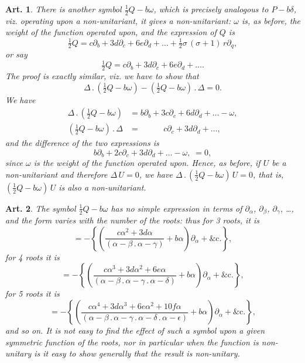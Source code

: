 \documentclass[11pt,a4paper]{article}
\theoremstyle{cayley}
\newtheorem{art}{Art.}[section]
\begin{document}
\setcounter{art}{27}
\begin{art}
There is another symbol $\frac{1}{2}Q - b\omega$, which is precisely analogous to $P - b\delta$, viz. operating upon a non-unitariant, it gives a non-unitariant: $\omega$ is, as before, the weight of the function operated upon, and the expression of $Q$ is
\[
\tfrac{1}{2}Q = c\partial_{b} + 3d\partial_{c} + 6e\partial_{d} + \ldots + \tfrac{1}{2}\sigma\,(\sigma + 1)\,r\partial_{q},
\]
or say
\[
\tfrac{1}{2}Q = c\partial_{b} + 3d\partial_{c} + 6e\partial_{d} + \ldots.
\]
The proof is exactly similar, viz. we have to show that
\[
\Delta\,.\,(\tfrac{1}{2}Q - b\omega) - (\tfrac{1}{2}Q - b\omega)\,.\,\Delta = 0.
\]
We have
\begin{align*}
\Delta\,.\,(\tfrac{1}{2}Q - b\omega) &= b\partial_{b} + 3c\partial_{c} + 6d\partial_{d} + \ldots - \omega,\\
(\tfrac{1}{2}Q - b\omega)\,.\,\Delta &= \phantom{b\partial_{b} +}\; c\partial_{c} + 3d\partial_{d} + \ldots,
\end{align*}
and the difference of the two expressions is
\[
b\partial_{b} + 2c\partial_{c} + 3d\partial_{d} + \ldots - \omega,\; = 0,
\]
since $\omega$ is the weight of the function operated upon. Hence, as before, if $U$ be a non-unitariant and therefore $\Delta\,U = 0$, we have $\Delta\,.\,(\frac{1}{2}Q - b\omega)\,U = 0$, that is, $(\frac{1}{2}Q - b\omega)\,U$ is also a non-unitariant.
\end{art}

\setcounter{art}{28}
\begin{art}
The symbol $\frac{1}{2}Q - b\omega$ has no simple expression in terms of $\partial_{\alpha}$, $\partial_{\beta}$, $\partial_{\gamma}$, \ldots, and the form varies with the number of the roots: thus for 3 roots, it is
\[
= -\left\{\left(\frac{c\alpha^{2} + 3d\alpha}{(\alpha - \beta\,.\,\alpha - \gamma)} + b\alpha\right)\partial_{\alpha} + \&\mathrm{c}.\right\},
\]
for 4 roots it is
\[
= -\left\{\left(\frac{c\alpha^{3} + 3d\alpha^{2} + 6e\alpha}{(\alpha - \beta\,.\,\alpha - \gamma\,.\,\alpha - \delta)} + b\alpha\right)\partial_{\alpha} + \&\mathrm{c}.\right\},
\]
for 5 roots it is
\[
= -\left\{\left(\frac{c\alpha^{4} + 3d\alpha^{3} + 6e\alpha^{2} + 10f\alpha}{(\alpha - \beta\,.\,\alpha - \gamma\,.\,\alpha - \delta\,.\,\alpha - \epsilon)} + b\alpha\right)\partial_{\alpha} + \&\mathrm{c}.\right\},
\]
and so on. It is not easy to find the effect of such a symbol upon a given symmetric function of the roots, nor in particular when the function is non-unitary is it easy to show generally that the result is non-unitary.
\end{art}
\end{document}
